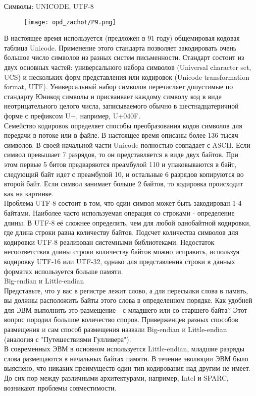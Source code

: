 \noindent Символы: UNICODE, UTF-8 \\
\begin{figure}[H]
    \centering
    \texttt{[image: opd\_zachot/P9.png]}
\end{figure}
\noindent В настоящее время используется (предложён в 91 году) общемировая кодовая таблица Unicode. Применение этого стандарта позволяет закодировать очень большое число символов из разных систем письменности. Стандарт состоит из двух основных частей: универсального набора символов (Universal character set, UCS) и нескольких форм представления или кодировок (Unicode transformation format, UTF). Универсальный набор символов перечисляет допустимые по стандарту Юникод символы и присваивает каждому символу код в виде неотрицательного целого числа, записываемого обычно в шестнадцатеричной форме с префиксом U+, например, U+040F. \\
Семейство кодировок определяет способы преобразования кодов символов для передачи в потоке или в файле. В настоящее время описаны более 136 тысяч символов. В своей начальной части Unicode полностью совпадает с ASCII. Если символ превышает 7 разрядов, то он представляется в виде двух байтов. При этом первые 5 битов предваряются преамбулой 110 и упаковываются в байт, следующий байт идет с преамбулой 10, и остальные 6 разрядов копируются во второй байт. Если символ занимает больше 2 байтов, то кодировка происходит как на картинке.  \\
Проблема UTF-8 состоит в том, что один символ может быть закодирован 1-4 байтами. Наиболее часто используемая операция со строками - определение длины. В UTF-8 её сложнее определить, чем для любой однобайтной кодировки, где длина строки равна количеству байтов. Подсчет количества символов для кодировки UTF-8 реализован системными библиотеками.
Недостаток несоответствия длины строки количеству байтов можно исправить, используя кодировку UTF-16 или UTF-32, однако для представления строки в данных форматах используется больше памяти. \\

\noindent Big-endian и Little-endian \\
Представьте, что у вас в регистре лежит слово, а для пересылки слова в память, вы должны расположить байты этого слова в определенном порядке. Как удобней для ЭВМ выполнить это размещение - с младшего или со старшего байта? Этот вопрос породил большое количество споров. Приверженцев разных способов размещения и сам способ размещения назвали Big-endian и Little-endian (аналогия с "Путешествиями Гулливера"). \\
В современных ЭВМ в основном используется Little-endian, младшие разряды слова размещаются в начальных байтах памяти. В течение эволюции ЭВМ было выяснено, что никаких преимуществ один тип кодирования над другим не имеет. До сих пор между различными архитектурами, например, Intel и SPARC, возникают проблемы совместимости. \\

